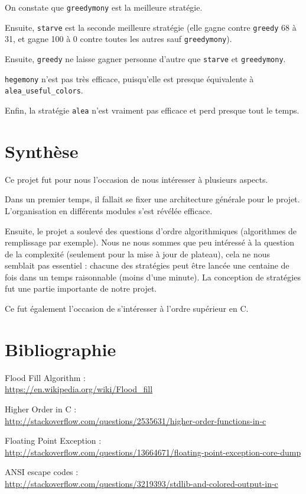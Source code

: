 \documentclass[12pt]{article}
\def\sec#1{\section{#1}}
\begin{document}
On constate que \texttt{greedymony} est la meilleure stratégie.

Ensuite, \texttt{starve} est la seconde meilleure stratégie (elle gagne contre \texttt{greedy} 68 à 31, et gagne 100 à 0 contre toutes les autres sauf \texttt{greedymony}).

Ensuite, \texttt{greedy} ne laisse gagner personne d'autre que \texttt{starve} et \texttt{greedymony}.

\texttt{hegemony} n'est pas très efficace, puisqu'elle est presque équivalente à \texttt{alea\_useful\_colors}.

Enfin, la stratégie \texttt{alea} n'est vraiment pas efficace et perd presque tout le temps.

\sec{Synthèse}
Ce projet fut pour nous l'occasion de nous intéresser à plusieurs aspects.

Dans un premier temps, il fallait se fixer une architecture générale pour le projet. L'organisation en différents modules s'est révélée efficace.

Ensuite, le projet a soulevé des questions d'ordre algorithmiques (algorithmes de remplissage par exemple). Nous ne nous sommes que peu intéressé à la question de la complexité (seulement pour la mise à jour de plateau), cela ne nous semblait pas essentiel : chacune des stratégies peut être lancée une centaine de fois dans un temps raisonnable (moins d'une minute). La conception de stratégies fut une partie importante de notre projet.

Ce fut également l'occasion de s'intéresser à l'ordre supérieur en C.



\sec{Bibliographie}

Flood Fill Algorithm : \\ \url{https://en.wikipedia.org/wiki/Flood_fill}

Higher Order in C : \\ \url{http://stackoverflow.com/questions/2535631/higher-order-functions-in-c}

Floating Point Exception : \\ \url{http://stackoverflow.com/questions/13664671/floating-point-exception-core-dump}

ANSI escape codes : \\ \url{http://stackoverflow.com/questions/3219393/stdlib-and-colored-output-in-c}
\end{document}
